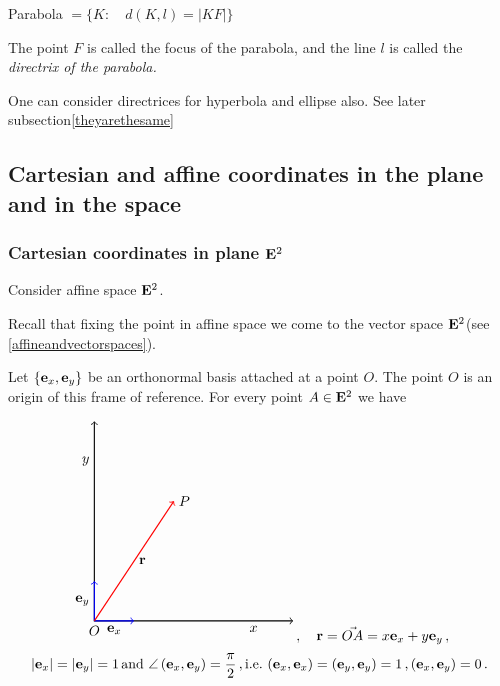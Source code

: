 \documentclass[12pt]{article}
\numberwithin{equation}{section}
\begin{document}
\m


Parabola $=\{K\colon\quad d(K,l)=|KF|\}$

\m       

The point $F$ is called the focus of the parabola,
and the line $l$  is called the {\it directrix of the parabola.}


\m

{\footnotesize  One can consider directrices for hyperbola
and ellipse also. See later subsection\ref{theyarethesame}}

\subsection {Cartesian and affine coordinates in the plane and 
in the space}

\subsubsection {Cartesian coordinates in plane ${\bf E}^2$}\label
{cartesiancoordinatesinplane}                      

Consider affine space ${\bf E}^2$.

Recall that fixing the point 
in affine space we come to the vector
space ${\bf E}^2$(see \ref{affineandvectorspaces}).
 
Let $\{{\bf e}_x,{\bf e}_y\}$ be an orthonormal basis attached at 
a  point
 $O$. The point $O$ is an origin of this frame of reference.
For every point $A\in {\bf E}^2$ we have

\begin{equation}\label{cartesiancoordinatesinplane0}
\begin{tikzpicture}
\draw 
[ <-> , thick] 
(5,0)--(0,0)--(0,5);

\draw [thick, ->,blue] (0,0)--(1,0);
\node [below] at (0.5,0) {$\e_x$};

\draw [thick, ->,blue] (0,0)--(0,1);
\node [left] at (0,0.5) {$\e_y$};

\node [left] at (0,4) {$y$};
\node [below] at (4,0) {$x$};
\node [below] at (0,0) {$O$};

\draw [thick, red,->] (0,0)--(2,3); 
\node [right] at (1,1.5) {$\r$};
\node [right] at (2,3) {$P$};
\end{tikzpicture}\,,\quad
\r=\vec {OA}=x\e_x+y\e_y\,,
\end{equation}
\begin{equation*}
|{\bf e}_x|=|{\bf e}_y|=1\, {\rm and }\,\,
\angle \left({\bf e}_x,{\bf e}_y\right)={\pi\over 2}\,, {\rm i.e.}\,\,
({\bf e}_x,{\bf e}_x)=({\bf e}_y,{\bf e}_y)=1\,, ({\bf e}_x,{\bf e}_y)=0\,.
\end{equation*}
\end{document}
